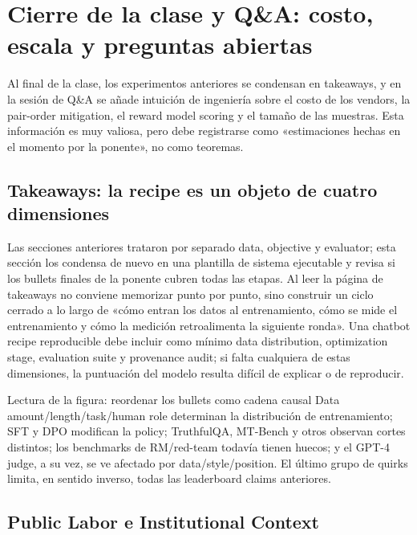 \section{Cierre de la clase y Q\&A: costo, escala y preguntas abiertas}

Al final de la clase, los experimentos anteriores se condensan en takeaways, y en la sesión de Q\&A se añade intuición de ingeniería sobre el costo de los vendors, la pair-order mitigation, el reward model scoring y el tamaño de las muestras. Esta información es muy valiosa, pero debe registrarse como «estimaciones hechas en el momento por la ponente», no como teoremas.

\subsection{Takeaways: la recipe es un objeto de cuatro dimensiones}

Las secciones anteriores trataron por separado data, objective y evaluator; esta sección los condensa de nuevo en una plantilla de sistema ejecutable y revisa si los bullets finales de la ponente cubren todas las etapas. Al leer la página de takeaways no conviene memorizar punto por punto, sino construir un ciclo cerrado a lo largo de «cómo entran los datos al entrenamiento, cómo se mide el entrenamiento y cómo la medición retroalimenta la siguiente ronda». Una chatbot recipe reproducible debe incluir como mínimo data distribution, optimization stage, evaluation suite y provenance audit; si falta cualquiera de estas dimensiones, la puntuación del modelo resulta difícil de explicar o de reproducir.


\begin{knowledgebox}{Lectura de la figura: reordenar los bullets como cadena causal}
Data amount/length/task/human role determinan la distribución de entrenamiento; SFT y DPO modifican la policy; TruthfulQA, MT-Bench y otros observan cortes distintos; los benchmarks de RM/red-team todavía tienen huecos; y el GPT-4 judge, a su vez, se ve afectado por data/style/position. El último grupo de quirks limita, en sentido inverso, todas las leaderboard claims anteriores.
\end{knowledgebox}

\subsection{Public Labor e Institutional Context}

